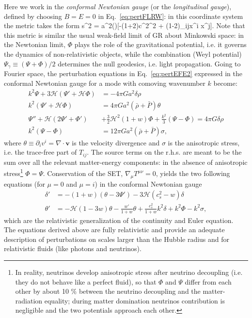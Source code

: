Here we work in the \emph{conformal Newtonian gauge} (or the \emph{longitudinal 
gauge}), defined by choosing $B = E = 0$ in  Eq.~\eqref{eq:pertFLRW}: in this coordinate system the metric takes the form 
%
\be
\label{eq:pertFLRW_conf}
\diff s^2 = a^2(\eta)[-(1+2\Phi)c^2\diff\eta^2 + (1-2\Psi)\delta_{ij}\diff x^i \diff x^j].
\ee
%
Note that this metric is similar the usual weak-field limit of GR about Minkowski space: in the Newtonian
limit, $\Phi$ plays the role of the gravitational potential, i.e. it governs the dynamics of non-relativistic
objects, while the combination (Weyl potential) $\Psi_{\gamma}\equiv (\Psi+\Phi)/2$ determines the null
geodesics, i.e. light propagation. Going to Fourier space, the perturbation equations in 
Eq.~\eqref{eq:pertEFE2} expressed in the conformal Newtonian gauge for a mode with comoving
wavenumber $k$ become:
%
\begin{align}
\label{eq:pertEFE3}
k^2\Psi + 3\mathcal{H}(\Psi' + \mathcal{H}\Phi) &= -4\pi Ga^2\delta\rho \\
k^2(\Psi'+\mathcal{H}\Phi) &= 4\pi G a^2 (\bar{\rho}+\bar{P})\theta \\
\Psi''+\mathcal{H}(2\Psi'+\Phi') &+ \frac{3}{2}\mathcal{H}^2(1+w)\Phi + \frac{k^2}{3}(\Psi-\Phi) = 4\pi G \delta\rho \\
k^2(\Psi-\Phi) &= 12\pi G a^2 (\bar{\rho}+\bar{P}) \sigma,
\end{align}
%
where $\theta \equiv \partial_i v^i = \nabla \cdot \mathbf{v}$ is the velocity divergence and $\sigma$ is the
anisotropic stress, i.e. the trace-free part of $T_{ij}$. 
The source terms on the r.h.s. are meant to be the sum over all the relevant matter-energy components:
in the absence of anisotropic stress\footnote{In reality, neutrinos develop anisotropic stress after neutrino decoupling (i.e. they do not behave like a perfect fluid), so that $\Phi$ and $\Psi$ differ from each other 
by about 10 \% between the neutrino decoupling and the matter-radiation equality; during matter 
domination neutrinos contribution is negligible and the two potentials approach each other.} $\Phi = \Psi$.
Conservation of the \gls{SET}, $\nabla_{\mu}T^{\mu\nu}=0$, yields the two following equations (for $\mu=0$ and $\mu=i$) in the conformal
Newtonian gauge \citep{Ma1995}
%
\begin{align}
\label{eq:pertSETeq}
\delta' &= -(1+w) (\theta - 3\Psi') - 3 \mathcal{H} (c_s^2 - w)\delta \\
\theta' &= -\mathcal{H}(1 - 3w)\theta - \frac{w'}{1+w}\theta + \frac{c_s^2}{1+w}k^2\delta + k^2\Phi - k^2\sigma,
\end{align}
%
which are the relativistic generalization of the continuity and Euler equation.\\
The equations derived above are fully relativistic and provide an adequate description of perturbations
on scales larger than the Hubble radius and for relativistic fluids (like photons and neutrinos).

